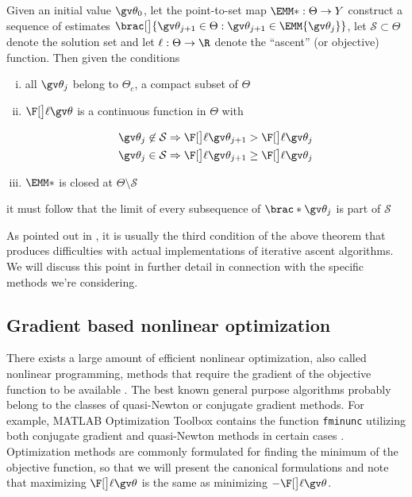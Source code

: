 \begin{theorem}
Given an initial value $\Th_0$, let the point-to-set map $\EMM*:\Theta\to Y$ construct a sequence
of estimates $\brac[\big]{\Th_{j+1}\in\Theta : \Th_{j+1}\in\EMM{\Th_j}}$, let $\mathcal{S}\subset\Theta$ denote the solution
set and let $\ell:\Theta\to\R$ denote the ``ascent'' (or objective) function. 
Then given the conditions
\begin{enumerate}[i)] \addtolength{\leftskip}{1cm} \itemsep1pt \parskip0pt 
	\item all $\Th_j$ belong to $\Theta_c$,  a compact subset of $\Theta$
	\item $\lLH$ is a continuous function in $\Theta$ with
\begin{eqspace}{5pt}{5pt}{1pt}{5pt}
\begin{align*}
	\Th_j \not\in \mathcal{S} \Rightarrow \lLH[\Th_{j+1}] > \lLH[\Th_j]\\  
	\Th_j \in \mathcal{S} \Rightarrow \lLH[\Th_{j+1}] \geq \lLH[\Th_j]  
\end{align*}
\end{eqspace}
	\item $\EMM*$ is closed at $\Theta\setminus\mathcal{S}$
\end{enumerate}
it must follow that the limit of every subsequence of $\brac*{\Th_j}$ is part of $\mathcal{S}$ 
\end{theorem}
As pointed out in \textcite{luenberger2008}, it is usually the third condition
of the above theorem that produces difficulties with actual implementations
of iterative ascent algorithms. We will discuss this point in further detail in connection
with the specific methods we're considering.
\subsection{Gradient based nonlinear optimization}\label{sec:grad}%

There exists a large amount of efficient nonlinear optimization,
also called nonlinear programming, methods that require the gradient of the 
objective function to be available \parencite{luenberger2008}.
The best known general purpose algorithms probably belong to the 
classes of quasi-Newton or conjugate gradient methods. 
For example, MATLAB Optimization Toolbox contains the function
\texttt{fminunc} utilizing both conjugate gradient and 
quasi-Newton methods in certain cases \parencite{optimizationtoolbox2012}.
Optimization methods are commonly formulated for finding the minimum of the
objective function, so that we will present the canonical formulations and note
that maximizing $\lLH$ is the same as minimizing $-\lLH$.

